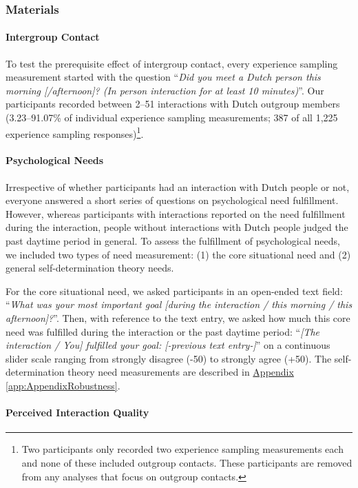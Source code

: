 \documentclass[man, 12pt, a4paper, mask]{apa7}
\theoremstyle{break}
\theoremstyle{plain}
\newcommand{\appref}[2][]{\hyperref[#2]{Appendix \ref*{#2}#1}}
\begin{document}
\subsubsection{Materials}

\paragraph{Intergroup Contact}

To test the prerequisite effect of intergroup contact, every experience
sampling measurement started with the question
``\textit{Did you meet a Dutch person this morning [/afternoon]? (In person interaction for at least 10 minutes)}''.
Our participants recorded between 2--51 interactions with Dutch outgroup
members (3.23--91.07\% of individual experience sampling measurements;
387 of all 1,225 experience sampling
responses)\footnote{Two participants only recorded two experience sampling measurements each and none of these included outgroup contacts. These participants are removed from any analyses that focus on outgroup contacts.}.

\paragraph{Psychological Needs}

Irrespective of whether participants had an interaction with Dutch
people or not, everyone answered a short series of questions on
psychological need fulfillment. However, whereas participants with
interactions reported on the need fulfillment during the interaction,
people without interactions with Dutch people judged the past daytime
period in general. To assess the fulfillment of psychological needs, we
included two types of need measurement: (1) the core situational need
and (2) general self-determination theory needs.

For the core situational need, we asked participants in an open-ended
text field:
``\textit{What was your most important goal [during the interaction / this morning / this afternoon]?}''.
Then, with reference to the text entry, we asked how much this core need
was fulfilled during the interaction or the past daytime period:
``\textit{[The interaction / You] fulfilled your goal: [-previous text entry-]}''
on a continuous slider scale ranging from strongly disagree (-50) to
strongly agree (+50). The self-determination theory need measurements
are described in \appref{app:AppendixRobustness}.

\paragraph{Perceived Interaction Quality}
\end{document}
